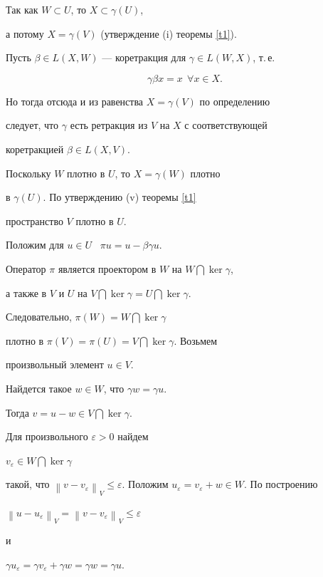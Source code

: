 \begin{pf}


Так как $W \subset U$, то $X \subset \gamma(U)$,


а потому $X=\gamma(V)$ (утверждение (i) теоремы \ref{t1}).


Пусть $\beta \in L(X,W)$ --- коретракция для $\gamma \in L(W,X)$, т.\,е.


$$


\gamma \beta x=x \ \ \forall x \in X.


$$


Но тогда отсюда и из равенства $X=\gamma(V)$ по определению


следует, что $\gamma$ есть ретракция из $V$ на $X$ с соответствующей


коретракцией $\beta \in L(X,V)$. 


Поскольку $W$ плотно в $U$, то $X=\gamma(W)$ плотно


в $\gamma(U)$. По утверждению (v) теоремы \ref{t1}


пространство $V$ плотно в $U$.





Положим для $u \in U$ \ $\pi u=u - \beta \gamma u$.


Оператор $\pi$ является проектором в $W$ на $W \bigcap \ker \gamma$,


а также в $V$ и $U$ на $V \bigcap \ker \gamma=U \bigcap \ker \gamma$.


Следовательно, $\pi(W)=W \bigcap \ker \gamma$


плотно в $\pi(V)=\pi(U)=V \bigcap \ker \gamma$. Возьмем


произвольный элемент $u \in V$.


Найдется такое $w \in W$, что $\gamma w=\gamma u$.


Тогда $v=u-w \in V \bigcap \ker \gamma$.


Для произвольного $\varepsilon > 0$ найдем


$v_\varepsilon \in W \bigcap \ker \gamma$


такой, что ${\left\| {v-v_\varepsilon } \right\|}_V \le


\varepsilon$. Положим $u_\varepsilon=v_\varepsilon+w \in W$. По построению


${\left\| {u-u_\varepsilon} \right\|}_V=


{\left\| {v-v_\varepsilon } \right\|}_V \le \varepsilon$


и


$\gamma u_\varepsilon=


\gamma v_\varepsilon+\gamma w=\gamma w=\gamma u$.


\end{pf}








